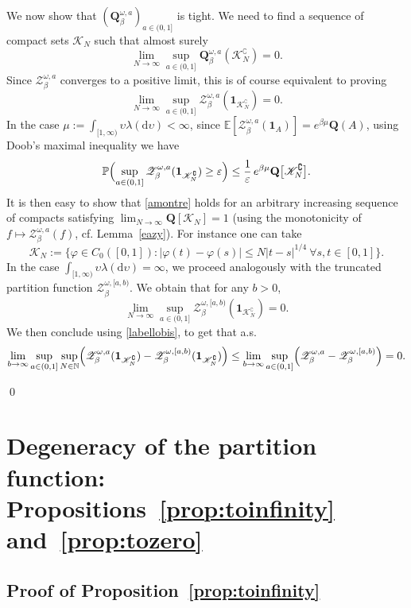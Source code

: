 \documentclass[11pt]{article}
\newcommand{\cf}{cf.\xspace}
\numberwithin{equation}{section}
\let\mathcal\mathscr
\let\sep:
\theoremstyle{definition}
\newcommand{\dd}{\mathrm{d}}
\newcommand{\ind}{\mathbf{1}}
\let\cc\complement
\newcommand{\cK}{{\ensuremath{\mathcal K}} }
\newcommand{\cZ}{{\ensuremath{\mathcal Z}} }
\newcommand{\bQ}{{\ensuremath{\mathbf Q}} }
\newcommand{\bbE}{{\ensuremath{\mathbb E}} }
\newcommand{\bbN}{{\ensuremath{\mathbb N}} }
\newcommand{\bbP}{{\ensuremath{\mathbb P}} }
\let\gb\beta
\let\gep\varepsilon
\let\ups\upsilon
\let\go\omega
\begin{document}
We now show that $(\bQ^{\go,a}_{\beta})_{a\in (0,1]}$ is tight.
We need to find a sequence of
compact sets $\cK_N$ such that almost surely
\[
\lim_{N\to \infty} \sup_{a\in(0,1]} \bQ^{\go,a}_{\beta}(\cK^{\cc}_N)=0.
\]
Since $\cZ^{\go,a}_{\beta}$ converges to a positive limit, this is of course equivalent to proving
\begin{equation}\label{amontre}
\lim_{N\to \infty} \sup_{a\in(0,1]} \cZ^{\go,a}_{\beta} (\ind_{\cK^{\cc}_N}) =0.
\end{equation}
In the case $\mu:=\int_{[1,\infty)} \ups \lambda(\dd \ups) <\infty$, since $\bbE[\cZ^{\go,a}_{\beta}(\ind_A)]= e^{\gb\mu} \bQ(A)$, using Doob's maximal inequality we have
\begin{equation}
\bbP \Bigl(\sup_{a\in(0,1]} \cZ^{\go,a}_{\beta}(\ind_{\cK^{\cc}_N})\ge \gep \Bigr)
\le \frac{1}{\gep}\, e^{\gb \mu}\bQ\bigl[\cK^{\cc}_N\bigr].
\end{equation}
It is then easy to show that \eqref{amontre} holds for an arbitrary increasing sequence of compacts satisfying $\lim_{N\to \infty} \bQ[ \cK_N]=1$
(using the monotonicity of $f\mapsto \cZ^{\go,a}_{\beta}(f)$, \cf Lemma~\ref{eazy}).
For instance one can take
\[
\cK_N:= \bigl\{ \varphi\in C_0([0,1])\sep |\varphi(t)-\varphi(s)|\le N |t-s|^{1/4} \ \forall s,t\in [0,1] \bigr\}.
\]
In the case $\int_{[1,\infty)} \ups \lambda(\dd \ups) =\infty$,
we proceed analogously with the truncated partition function
$\cZ_{\gb}^{\go,[a,b)}$.
We obtain that for any $b>0$,
\[
\lim_{N\to\infty} \sup_{a\in (0,1]} \cZ_{\gb}^{\go,[a,b)} (\ind_{\cK_N^\cc}) =0.
\]
We then conclude using \eqref{labellobis}, to get that a.s.
\[
\lim_{b\to\infty} \sup_{a\in (0,1]} \sup_{N\in \bbN} \Bigl(\cZ_{\gb}^{\go,a} (\ind_{\cK_N^\cc}) - \cZ_{\gb}^{\go,[a,b)} (\ind_{\cK_N^\cc}) \Bigr)
\leq \lim_{b\to\infty} \sup_{a\in (0,1]} \Bigl(\cZ_{\gb}^{\go,a} - \cZ_{\gb}^{\go,[a,b)} \Bigr) =0.
\]
\par\vspace{-\baselineskip}
\qed

\section{Degeneracy of the partition function: Propositions~\ref{prop:toinfinity} and~\ref{prop:tozero}}
\label{sec:trivial}

\subsection{Proof of Proposition~\ref{prop:toinfinity}}
\label{sec:infinity}
\end{document}
